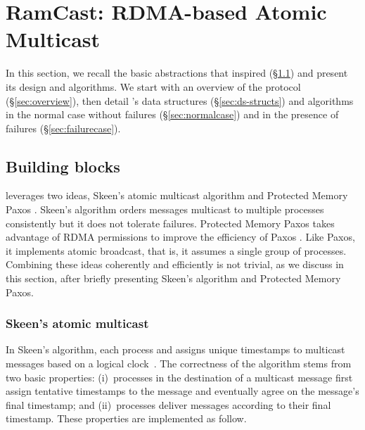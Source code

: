 
\section{RamCast: RDMA-based Atomic Multicast}
\label{sec:rdma-atomic-multicast}

In this section, we recall the basic abstractions that inspired \libname (\S\ref{sec:bblocks}) and present its design and algorithms. 
We start with an overview of the protocol (\S\ref{sec:overview}), then detail \libname's data structures (\S\ref{sec:ds-structs}) and algorithms in the normal case without failures (\S\ref{sec:normalcase}) and in the presence of failures (\S\ref{sec:failurecase}).

\subsection{Building blocks}
\label{sec:bblocks}

\libname leverages two ideas, Skeen's atomic multicast algorithm \cite{BJ87b} and Protected Memory Paxos \cite{Aguilera2019}.
Skeen's algorithm orders messages multicast to multiple processes consistently but it does not tolerate failures.
Protected Memory Paxos takes advantage of RDMA permissions to improve the efficiency of Paxos \cite{L98}. 
Like Paxos, it implements atomic broadcast, that is, it assumes a single group of processes.
Combining these ideas coherently and efficiently is not trivial, as we discuss in this section,
after briefly presenting Skeen's algorithm and Protected Memory Paxos.


\subsubsection{Skeen's atomic multicast}

In Skeen's algorithm, each process and assigns unique timestamps to multicast messages based on a logical clock~\cite{Lam78}.
The correctness of the algorithm stems from two basic properties:
(i)~processes in the destination of a multicast message first assign tentative timestamps to the message and eventually agree on the message's final timestamp; and
(ii)~processes deliver messages according to their final timestamp.
These properties are implemented as follow.

